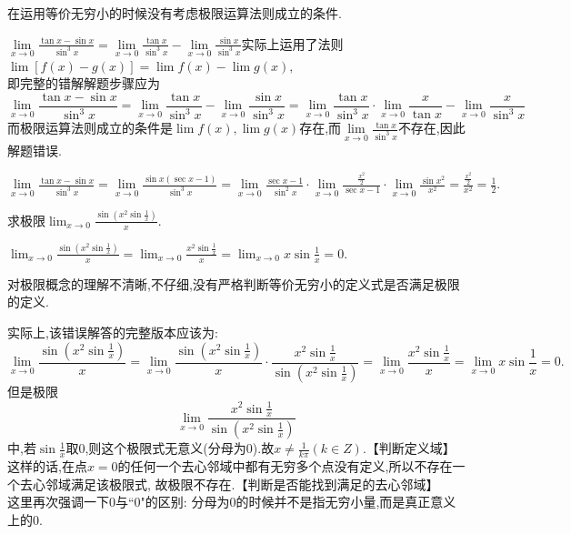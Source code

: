 \errreason  在运用等价无穷小的时候没有考虑极限运算法则成立的条件.

\solvereason $\displaystyle \lim\limits_{x \to 0}\frac{\tan x -\sin x}{\sin^3 x}=\lim\limits_{x \to 0}\frac{\tan x}{\sin^3 x} - \lim\limits_{x \to 0}\frac{\sin x}{\sin^3 x}$实际上运用了法则$\lim [f(x)-g(x)]=\lim f(x)-\lim g(x),$\\[1em]即完整的错解解题步骤应为
\begin{equation*}
\lim\limits_{x \to 0}\frac{\tan x -\sin x}{\sin^3 x}=\lim\limits_{x \to 0}\frac{\tan x}{\sin^3 x} - \lim\limits_{x \to 0}\frac{\sin x}{\sin^3 x}
=\lim\limits_{x \to 0}\frac{\tan x}{\sin^3 x}\cdot \lim\limits_{x \to 0} \frac{x}{\tan x}-\lim\limits_{x \to 0}\frac{x}{\sin^3 x}
\end{equation*}
而极限运算法则成立的条件是$\lim f(x),\lim g(x)$存在,而$\displaystyle \lim\limits_{x \to 0}\frac{\tan x}{\sin^3 x}$不存在,因此解题错误.

\solve $\displaystyle \lim\limits_{x \to 0}\frac{\tan x -\sin x}{\sin^3 x}=\lim\limits_{x \to 0}\frac{\sin x(\sec x-1)}{\sin^3 x}=\lim\limits_{x \to 0}\frac{\sec x-1}{\sin^2 x} \cdot \lim\limits_{x \to 0}\frac{\frac{x^2}{2}}{\sec x -1} \cdot \lim\limits_{x \to 0}\frac{\sin x^2}{x^2}
=\frac{\frac{x^2}{2}}{x^2}=\frac{1}{2}.$\jg

\examples 求极限$\displaystyle \lim_{x \to 0} \frac{\sin \left(x^2 \sin{\frac{1}{x}}\right) }{x}.$

\errsolve $\displaystyle \lim_{x \to 0}\frac{\sin \left(x^2 \sin{\frac{1}{x}}\right) }{x}=\lim_{x \to 0}\frac{x^2 \sin \frac{1}{x}}{x}=\lim_{x \to 0}x\sin\frac{1}{x}=0.$

\errreason 对极限概念的理解不清晰,不仔细,没有严格判断等价无穷小的定义式是否满足极限的定义.

\solvereason 实际上,该错误解答的完整版本应该为:
\[
\lim_{x \to 0} \frac{\sin \left(x^2 \sin{\frac{1}{x}}\right) }{x}=\lim_{x \to 0} \frac{\sin \left(x^2 \sin{\frac{1}{x}}\right) }{x}\cdot\frac{x^2\sin \frac{1}{x}}{\sin \left( x^2 \sin \frac{1}{x}\right) }=\lim_{x \to 0}\frac{x^2\sin\frac{1}{x}}{x}=\lim_{x \to 0}x\sin \frac{1}{x}=0.
\]
但是极限
\[
\lim_{x \to 0}\frac{x^2\sin \frac{1}{x}}{\sin \left( x^2\sin \frac{1}{x}\right) }
\]
中,若$\displaystyle \sin \frac{1}{x}$取0,则这个极限式无意义(分母为0).故$\displaystyle x \ne \frac{1}{k \pi}(k \in Z).$\hspace*{11.5em}【判断定义域】\\[0.5em]
\hspace*{2em}这样的话,在点$x = 0$的任何一个去心邻域中都有无穷多个点没有定义,所以不存在一个去心邻域满足该极限式,
故极限不存在.\hspace*{24em}【判断是否能找到满足的去心邻域】\\[0.5em]
这里再次强调一下0与``0"的区别: 分母为0的时候并不是指无穷小量,而是真正意义上的0.

